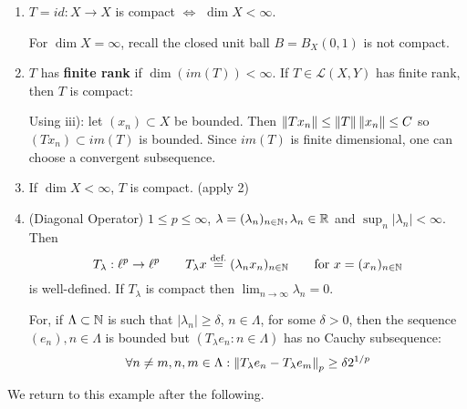 \documentclass{article}
\begin{document}
\begin{example}
\label{examples of compact operators}
\begin{enumerate}[1)]
    \item $T=id:X\to X$ is compact $\iff$ $\dim X <\infty$.  
    
    For $\dim X=\infty$, recall the closed unit ball $B=B_X(0,1)$ is not compact. 
    
    \item $T$ has \textbf{finite rank} if $\dim (im(T))<\infty$. If $T\in \mathcal{L}(X,Y)$ has finite rank, then $T$ is compact:   
    
    Using  iii): let $(x_n)\subset X$ be bounded. Then $\left\|{Tx_n}\right\| \leq \left\|{T}\right\|\left\|{x_n}\right\| \leq C$ so $(Tx_n)\subset im(T)$ is bounded. Since $im(T)$ is finite dimensional, one can choose a convergent subsequence.  

    \item If $\dim X<\infty$, $T$ is compact. (apply 2)

    \item (Diagonal Operator) $1\leq p \leq \infty$, $\lambda = (\lambda_n)_{n \in \mathbb{N}}, \lambda_n \in \mathbb{R}$ and $\sup_n |\lambda_n|<\infty$. Then  
    $$
    T_\lambda: \ell^p \to \ell^p \qquad T_\lambda x \stackrel{\text{def.}}{=} (\lambda_n x_n)_{n\in \mathbb{N}} \qquad \text{for\ } x=(x_n)_{n\in \mathbb{N}}
    $$
    is well-defined. If $T_\lambda$ is compact then $\lim_{n\to \infty} \lambda_n = 0$.  

    For, if $\Lambda \subset \mathbb{N}$ is such that $|\lambda_n|\geq \delta$, $n\in \Lambda$, for some $\delta>0$, then the sequence $(e_n), n\in \Lambda$ is bounded but $(T_{\lambda}e_n: n\in \Lambda)$ has no Cauchy subsequence:  
    $$
    \forall n\neq m, n,m\in \Lambda: \left\|{T_\lambda e_n - T_\lambda e_m}\right\|_p \geq \delta 2^{1/p}
    $$  
\end{enumerate}
\end{example}

We return to this example after the following.  
\end{document}
